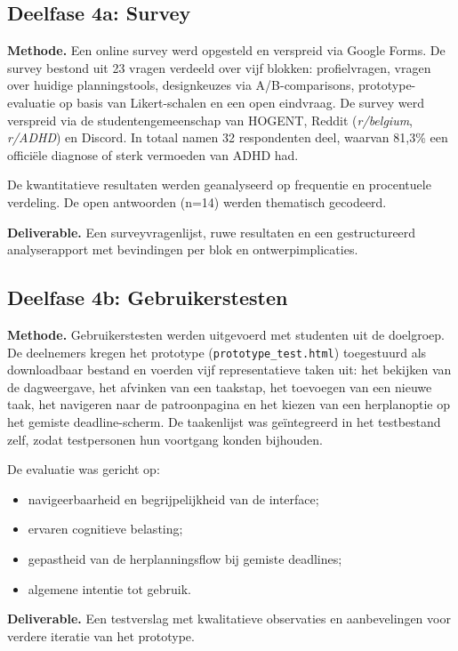 \subsection{Deelfase 4a: Survey}

\textbf{Methode.}
Een online survey werd opgesteld en verspreid via Google Forms. De survey bestond
uit 23 vragen verdeeld over vijf blokken: profielvragen, vragen over huidige
planningstools, designkeuzes via A/B-comparisons, prototype-evaluatie op basis
van Likert-schalen en een open eindvraag. De survey werd verspreid via de
studentengemeenschap van HOGENT, Reddit (\textit{r/belgium}, \textit{r/ADHD})
en Discord. In totaal namen 32 respondenten deel, waarvan 81,3\% een officiële
diagnose of sterk vermoeden van ADHD had.

De kwantitatieve resultaten werden geanalyseerd op frequentie en procentuele
verdeling. De open antwoorden (n=14) werden thematisch gecodeerd.

\textbf{Deliverable.}
Een surveyvragenlijst, ruwe resultaten en een gestructureerd analyserapport met
bevindingen per blok en ontwerpimplicaties.

\subsection{Deelfase 4b: Gebruikerstesten}

\textbf{Methode.}
Gebruikerstesten werden uitgevoerd met studenten uit de doelgroep. De deelnemers
kregen het prototype (\texttt{prototype\_test.html}) toegestuurd als downloadbaar
bestand en voerden vijf representatieve taken uit: het bekijken van de dagweergave,
het afvinken van een taakstap, het toevoegen van een nieuwe taak, het navigeren
naar de patroonpagina en het kiezen van een herplanoptie op het gemiste
deadline-scherm. De taakenlijst was geïntegreerd in het testbestand zelf, zodat
testpersonen hun voortgang konden bijhouden.

De evaluatie was gericht op:
\begin{itemize}
  \item navigeerbaarheid en begrijpelijkheid van de interface;
  \item ervaren cognitieve belasting;
  \item gepastheid van de herplanningsflow bij gemiste deadlines;
  \item algemene intentie tot gebruik.
\end{itemize}

\textbf{Deliverable.}
Een testverslag met kwalitatieve observaties en aanbevelingen voor verdere
iteratie van het prototype.

